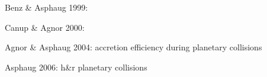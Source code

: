 \cite{Chambers:2001p2105}
\citep{chandrasekhar1969ellipsoidal}
\cite{Lissauer:1993p56}
\cite{Wetherill:1993p3351}






\cite{Benz:1988p3336}

\cite{Benz1999Icar..142....5B}
Benz \& Asphaug 1999:

\cite{Canup:2000p3542}
Canup \& Agnor 2000:
	
\cite{Agnor:2004p3329}
Agnor \& Asphaug 2004: accretion efficiency during planetary collisions

\cite{Asphaug:2006p3729}
Asphaug 2006: h\&r planetary collisions

